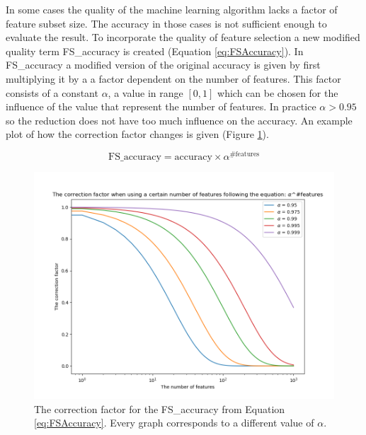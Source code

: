 	In some cases the quality of the machine learning algorithm lacks a factor of feature subset size. The accuracy in those cases is not sufficient enough to evaluate the result. To incorporate the quality of feature selection a new modified quality term FS\_accuracy is created (Equation \ref{eq:FSAccuracy}). In FS\_accuracy a modified version of the original accuracy is given by first multiplying it by a a factor dependent on the number of features. This factor consists of a constant $\alpha$, a value in range $[0, 1]$ which can be chosen for the influence of the  value that represent the number of features. In practice $\alpha > 0.95$ so the reduction does not have too much influence on the accuracy. An example plot of how the correction factor changes is given (Figure \ref{fig:FSAccuracyPlot}).
	
	\begin{equation*}
	\label{eq:FSAccuracy}
	\text{FS\_accuracy} = \text{accuracy} \times \alpha^{\text{\#features}}
	\end{equation*}
		
	\begin{figure}[H]
		\includegraphics[width=1\textwidth]{FS_accuracy_alpha.png}
		\caption{The correction factor for the FS\_accuracy from Equation \ref{eq:FSAccuracy}. Every graph corresponds to a different value of $\alpha$.}
		\label{fig:FSAccuracyPlot}
	\end{figure}
	
